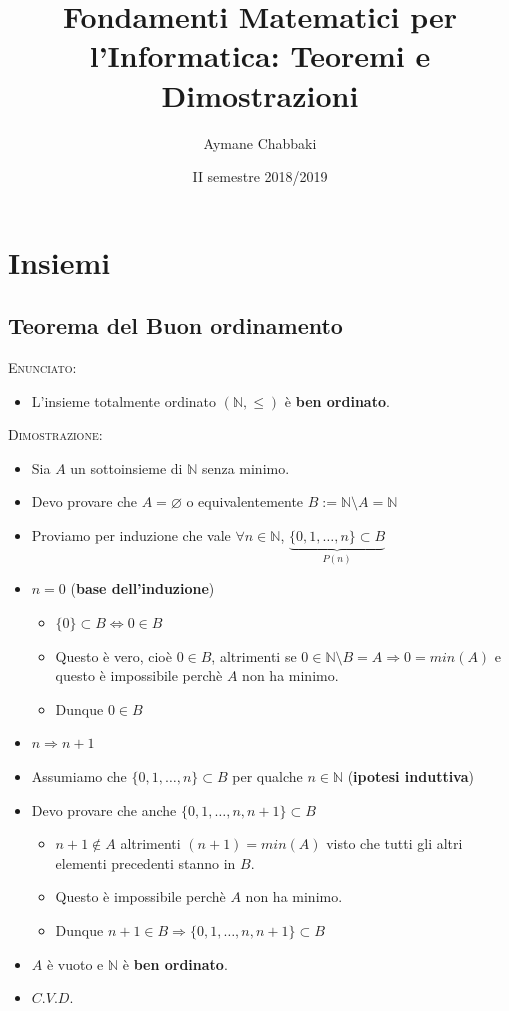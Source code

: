 \documentclass[10pt]{article}
\title{Fondamenti Matematici per l'Informatica: Teoremi e Dimostrazioni}
\author{Aymane Chabbaki}
\date{II semestre 2018/2019}
\begin{document}
\maketitle
\tableofcontents
\newpage
\section{Insiemi}
\subsection{Teorema del Buon ordinamento}
\textsc{Enunciato:}
\begin{itemize}
\item
L'insieme totalmente ordinato $(\mathbb{N}, \leq)$ è \textbf{ben ordinato}.
\end{itemize}
\textsc{Dimostrazione:}
\begin{itemize}
\item
Sia $A$ un sottoinsieme di $\mathbb{N}$ senza minimo. 
\item
Devo provare che $A = \varnothing $ o equivalentemente $B := \mathbb{N} \setminus \! A = \mathbb{N}$
\item
Proviamo per induzione che vale $\forall n \!\in\! \mathbb{N}$, $ \underbrace{\{0,1,\dots,n\} \subset B}_{P(n)} $
\item
$n=0$ (\textbf{base dell'induzione})
\begin{itemize}
\item
$\{0\} \subset B \Longleftrightarrow 0 \in B$
\item
Questo è vero, cioè $0 \!\in\! B$, altrimenti se $0 \in \mathbb{N} \setminus \! B = A \Longrightarrow 0 = min(A)$ e questo è impossibile perchè $A$ non ha minimo.
\item
Dunque $0 \!\in\! B$
\end{itemize}
\item
$n \Longrightarrow n+1$
\item
Assumiamo che  $\{0,1,\dots,n\} \subset B$ per qualche $n \!\in \!\mathbb{N}$ (\textbf{ipotesi induttiva})
\item
Devo provare che anche $\{0,1,\dots,n, n+1\} \subset B$
\begin{itemize}
\item
$n+1 \not \in A$ altrimenti $(n+1) = min(A)$ visto che tutti gli altri elementi precedenti stanno in $B$.
\item
Questo è impossibile perchè $A$ non ha minimo.
\item
Dunque $n+1 \in B \Longrightarrow \{0,1,\dots,n, n+1\} \subset B $
\end{itemize}
\item
$A$ è vuoto e $\mathbb{N}$ è \textbf{ben ordinato}.
\item
$C.V.D.$
\end{itemize}
\end{document}
